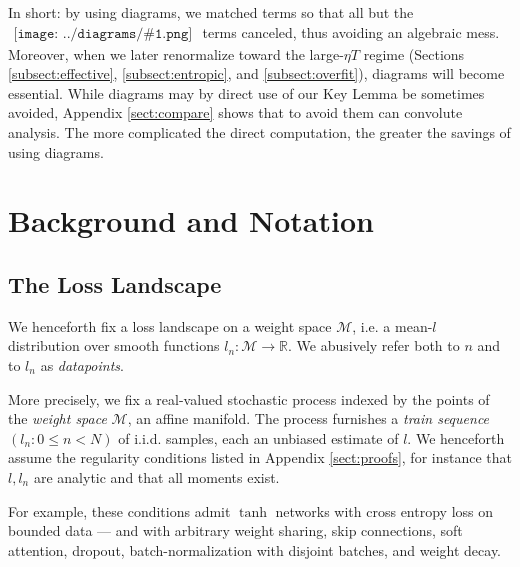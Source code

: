 \documentclass{article}
\theoremstyle{plain}
\theoremstyle{definition}
\newcommand{\Mm}{\mathcal{M}}
\newcommand{\RR}{\mathbb{R}}
\newcommand{\sdia}[1]{\begin{gathered}\texttt{[image: ../diagrams/\#1.png]}\end{gathered}}
\begin{document}
            In short: by using diagrams, we matched terms so that all but the
            $\sdia{c(01-2)(01-12)}$ terms canceled, thus avoiding an algebraic
            mess.  Moreover, when we later renormalize toward the large-$\eta
            T$ regime (Sections \ref{subsect:effective},
            \ref{subsect:entropic}, and \ref{subsect:overfit}), diagrams will
            become essential.  While diagrams may by direct use of our Key
            Lemma be sometimes avoided, Appendix \ref{sect:compare} shows that
            to avoid them can convolute analysis.  The more complicated the
            direct computation, the greater the savings of using diagrams.


\section{Background and Notation} \label{sect:background}


    \subsection{The Loss Landscape}
        We henceforth fix a loss landscape on a weight space $\Mm$, i.e. a
        mean-$l$ distribution over smooth functions $l_n:\Mm\to\RR$.
        We abusively refer both to $n$ and to $l_n$ as
        \emph{datapoints}.

        More precisely, we fix a real-valued stochastic process indexed by the
        points of the \emph{weight space} $\Mm$, an affine manifold.  The
        process furnishes a \emph{train sequence} $(l_n: 0\leq n<N)$ of i.i.d.
        samples, each an unbiased estimate of $l$. We henceforth assume the
        regularity conditions listed in Appendix \ref{sect:proofs}, for
        instance that $l, l_n$ are analytic and that all moments exist.

        For example, these conditions admit $\tanh$ networks with cross entropy
        loss on bounded data --- and with arbitrary weight sharing, skip
        connections, soft attention, dropout, batch-normalization with disjoint
        batches, and weight decay.
        
\end{document}
